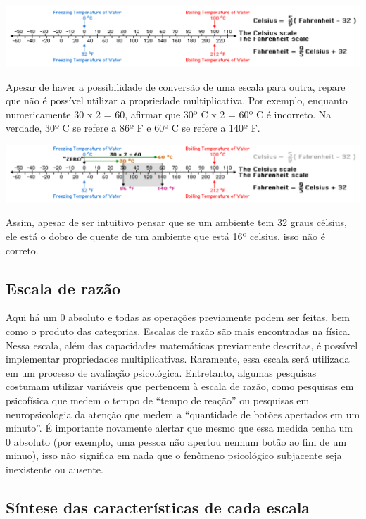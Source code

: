 \documentclass[
]{book}
\begin{document}
\includegraphics{./img/cap_escala_medida_farenheit1.png}

Apesar de haver a possibilidade de conversão de uma escala para outra, repare que não é possível utilizar a propriedade multiplicativa. Por exemplo, enquanto numericamente 30 x 2 = 60, afirmar que 30º C x 2 = 60º C é incorreto. Na verdade, 30º C se refere a 86º F e 60º C se refere a 140º F.

\includegraphics{./img/cap_escala_medida_farenheit2.png}

Assim, apesar de ser intuitivo pensar que se um ambiente tem 32 graus célsius, ele está o dobro de quente de um ambiente que está 16º celsius, isso não é correto.

\hypertarget{escala-de-razuxe3o}{%
\subsection{Escala de razão}\label{escala-de-razuxe3o}}

Aqui há um 0 absoluto e todas as operações previamente podem ser feitas, bem como o produto das categorias. Escalas de razão são mais encontradas na física. Nessa escala, além das capacidades matemáticas previamente descritas, é possível implementar propriedades multiplicativas. Raramente, essa escala será utilizada em um processo de avaliação psicológica. Entretanto, algumas pesquisas costumam utilizar variáveis que pertencem à escala de razão, como pesquisas em psicofísica que medem o tempo de ``tempo de reação'' ou pesquisas em neuropsicologia da atenção que medem a ``quantidade de botões apertados em um minuto''. É importante novamente alertar que mesmo que essa medida tenha um 0 absoluto (por exemplo, uma pessoa não apertou nenhum botão ao fim de um minuo), isso não significa em nada que o fenômeno psicológico subjacente seja inexistente ou ausente.

\hypertarget{suxedntese-das-caracteruxedsticas-de-cada-escala}{%
\subsection{Síntese das características de cada escala}\label{suxedntese-das-caracteruxedsticas-de-cada-escala}}
\end{document}
